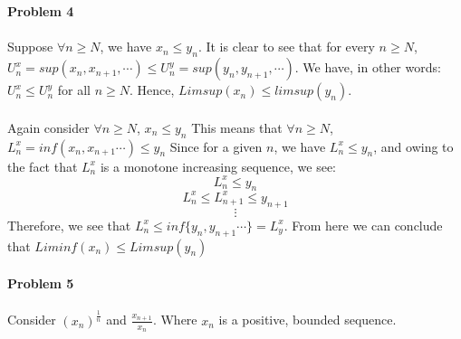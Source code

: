 \documentclass[../Main.tex]{subfiles}
\begin{document}
\\\\\textbf{Problem 4}
\\\\ Suppose $\forall n \geq N$, we have $x_n \leq y_n$. 
It is clear to see that for every $n \geq N$, $U_n^x=sup(x_n,x_{n+1},\cdots)\leq 
U_n^y=sup(y_n,y_{n+1},\cdots)$. We have, in other words:
$U_n^x \leq U_n^y$ for all $n \geq N$. Hence, $Limsup(x_n)\leq limsup(y_n)$.
\\\\ Again consider $\forall n \geq N$, $x_n \leq y_n$
This means that $\forall n \geq N$, $L_n^x= inf(x_n,x_{n+1}\cdots) \leq y_n$
Since for a given $n$, we have $L_n^x \leq y_n$, and owing 
to the fact that $L_n^x$ is a monotone increasing sequence, we
see:
$$L_n^x\leq y_n $$
$$L_n^x \leq L_{n+1}^x \leq y_{n+1} $$
$$\vdots $$
Therefore, we see that $L_n^x \leq inf\{y_n,y_{n+1}\cdots\}=L_y^x$.
From here we can conclude that $Liminf(x_n) \leq Limsup(y_n)$
\\\\ \textbf{Problem 5}
\\\\ Consider $(x_n)^{\frac{1}{n}}$ and $\frac{x_{n+1}}{x_n}$. Where $x_n$ is a positive, bounded sequence.
\end{document}
